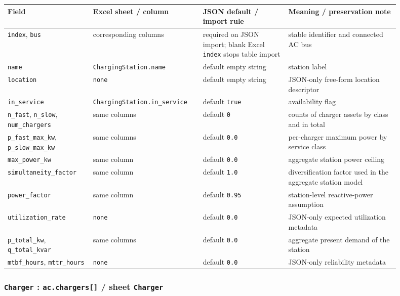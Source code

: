 \begin{longtable}{L{0.20\linewidth}L{0.24\linewidth}L{0.20\linewidth}L{0.26\linewidth}}
\toprule
Field & Excel sheet / column & JSON default / import rule & Meaning / preservation note \\
\midrule
\endhead
\texttt{index}, \texttt{bus} & corresponding columns & required on JSON import; blank Excel \texttt{index} stops table import & stable identifier and connected AC bus \\
\texttt{name} & \texttt{ChargingStation.name} & default empty string & station label \\
\texttt{location} & \texttt{none} & default empty string & JSON-only free-form location descriptor \\
\texttt{in\_service} & \texttt{ChargingStation.in\_service} & default \texttt{true} & availability flag \\
\texttt{n\_fast}, \texttt{n\_slow}, \texttt{num\_chargers} & same columns & default \texttt{0} & counts of charger assets by class and in total \\
\texttt{p\_fast\_max\_kw}, \texttt{p\_slow\_max\_kw} & same columns & default \texttt{0.0} & per-charger maximum power by service class \\
\texttt{max\_power\_kw} & same column & default \texttt{0.0} & aggregate station power ceiling \\
\texttt{simultaneity\_factor} & same column & default \texttt{1.0} & diversification factor used in the aggregate station model \\
\texttt{power\_factor} & same column & default \texttt{0.95} & station-level reactive-power assumption \\
\texttt{utilization\_rate} & \texttt{none} & default \texttt{0.0} & JSON-only expected utilization metadata \\
\texttt{p\_total\_kw}, \texttt{q\_total\_kvar} & same columns & default \texttt{0.0} & aggregate present demand of the station \\
\texttt{mtbf\_hours}, \texttt{mttr\_hours} & \texttt{none} & default \texttt{0.0} & JSON-only reliability metadata \\
\bottomrule
\end{longtable}

\subsubsection*{\texttt{Charger} : \texttt{ac.chargers[]} / sheet \texttt{Charger}}

